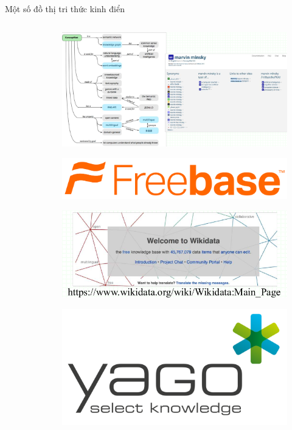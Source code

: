 \documentclass[notheorems, aspectratio=54]{beamer}
\begin{document}
\begin{frame}{Một số đồ thị tri thức kinh điển}
\begin{columns}
\begin{column}{0.5\textwidth}
\begin{figure}[H]
					\label{fig:writing-thesis}
				\end{figure}
			\end{column}
			\begin{column}{0.5\textwidth}
				\begin{figure}[H]
					\includegraphics[width=0.5\linewidth]{figs/conceptnet.png}
					\label{fig:writing-thesis}
				\end{figure}
				\begin{figure}[H]
					\includegraphics[width=0.5\linewidth]{figs/fb.png}
					\label{fig:writing-thesis}
				\end{figure}
				\begin{figure}[H]
					\includegraphics[width=0.5\linewidth]{figs/wikidata.png}
					\label{fig:writing-thesis}
				\end{figure}
				\begin{figure}[H]
					\includegraphics[width=0.5\linewidth]{figs/yago.png}
					\label{fig:writing-thesis}
				\end{figure}
			\end{column}
		\end{columns}		
	\end{frame}
\end{document}
